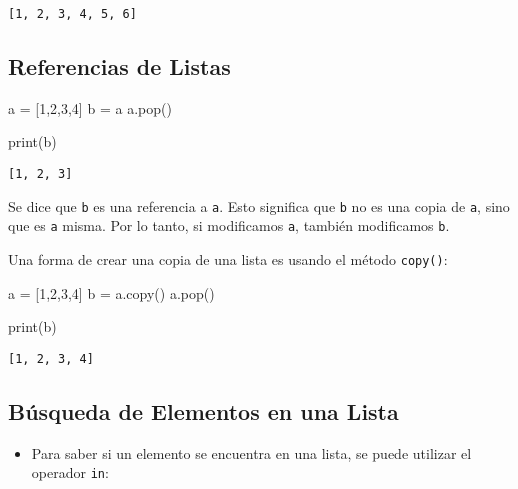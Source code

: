 \documentclass[
  letterpaper,
  DIV=11,
  numbers=noendperiod]{scrreprt}
\newenvironment{Shaded}{\begin{snugshade}}{\end{snugshade}}
\newcommand{\BuiltInTok}[1]{\textcolor[rgb]{0.00,0.23,0.31}{#1}}
\newcommand{\DecValTok}[1]{\textcolor[rgb]{0.68,0.00,0.00}{#1}}
\newcommand{\NormalTok}[1]{\textcolor[rgb]{0.00,0.23,0.31}{#1}}
\newcommand{\OperatorTok}[1]{\textcolor[rgb]{0.37,0.37,0.37}{#1}}
\providecommand{\tightlist}{%
  \setlength{\itemsep}{0pt}\setlength{\parskip}{0pt}}\usepackage{longtable,booktabs,array}
\begin{document}
\begin{verbatim}
[1, 2, 3, 4, 5, 6]
\end{verbatim}

\subsection{Referencias de Listas}\label{referencias-de-listas}

\begin{Shaded}
\begin{Highlighting}[]
\NormalTok{a }\OperatorTok{=}\NormalTok{ [}\DecValTok{1}\NormalTok{,}\DecValTok{2}\NormalTok{,}\DecValTok{3}\NormalTok{,}\DecValTok{4}\NormalTok{]}
\NormalTok{b }\OperatorTok{=}\NormalTok{ a}
\NormalTok{a.pop()}

\BuiltInTok{print}\NormalTok{(b)}
\end{Highlighting}
\end{Shaded}

\begin{verbatim}
[1, 2, 3]
\end{verbatim}

Se dice que \texttt{b} es una referencia a \texttt{a}. Esto significa
que \texttt{b} no es una copia de \texttt{a}, sino que es \texttt{a}
misma. Por lo tanto, si modificamos \texttt{a}, también modificamos
\texttt{b}.

Una forma de crear una copia de una lista es usando el método
\texttt{copy()}:

\begin{Shaded}
\begin{Highlighting}[]
\NormalTok{a }\OperatorTok{=}\NormalTok{ [}\DecValTok{1}\NormalTok{,}\DecValTok{2}\NormalTok{,}\DecValTok{3}\NormalTok{,}\DecValTok{4}\NormalTok{]}
\NormalTok{b }\OperatorTok{=}\NormalTok{ a.copy()}
\NormalTok{a.pop()}

\BuiltInTok{print}\NormalTok{(b)}
\end{Highlighting}
\end{Shaded}

\begin{verbatim}
[1, 2, 3, 4]
\end{verbatim}

\subsection{Búsqueda de Elementos en una
Lista}\label{buxfasqueda-de-elementos-en-una-lista}

\begin{itemize}
\tightlist
\item
  Para saber si un elemento se encuentra en una lista, se puede utilizar
  el operador \texttt{in}:
\end{itemize}
\end{document}

